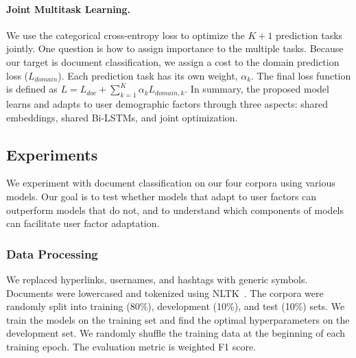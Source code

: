 \paragraph{Joint Multitask Learning.} We use the categorical cross-entropy loss to optimize the $K+1$ prediction tasks jointly. One question is how to assign importance to the multiple tasks. Because our target is document classification, we assign a cost to the domain prediction loss ($L_{domain}$). Each prediction task has its own weight, $\alpha_k$. The final loss function is defined as $L = L_{doc} + \sum_{k=1}^K \alpha_k L_{domain, k}$. In summary, the proposed model learns and adapts to user demographic factors through three aspects: shared embeddings, shared Bi-LSTMs, and joint optimization.

\subsection{Experiments}
\label{sec:experiments}
  
We experiment with document classification on our four corpora using various models. Our goal is to test whether models that adapt to user factors can outperform models that do not, and to understand which components of models can facilitate user factor adaptation.
  
\subsubsection{Data Processing}

We replaced hyperlinks, usernames, and hashtags with generic symbols. Documents were lowercased and tokenized using NLTK~\cite{bird2004nltk}. 
The corpora were randomly split into training (80\%), development (10\%), and test (10\%) sets. %
We train the models on the training set and find the optimal hyperparameters on the development set. We randomly shuffle the training data at the beginning of each training epoch. The evaluation metric is weighted F1 score.

%
%

